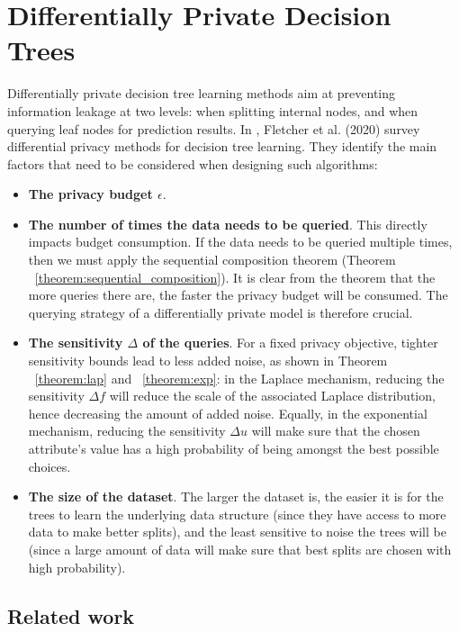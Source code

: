 \chapter{Differentially Private Decision Trees}

Differentially private decision tree learning methods aim at preventing information leakage at two levels: when splitting internal nodes, and when querying leaf nodes for prediction results. In \cite{fletcher_survey}, Fletcher et al. (2020) survey differential privacy methods for decision tree learning. They identify the main factors that need to be considered when designing such algorithms: 

\begin{itemize}
	\item \textbf{The privacy budget $\epsilon$}.
	\item \textbf{The number of times the data needs to be queried}. This directly impacts budget consumption. If the data needs to be queried multiple times, then we must apply the sequential composition theorem (Theorem ~\ref{theorem:sequential_composition}). It is clear from the theorem that the more queries there are, the faster the privacy budget will be consumed. The querying strategy of a differentially private model is therefore crucial.
	\item \textbf{The sensitivity $\Delta$ of the queries}. For a fixed privacy objective, tighter sensitivity bounds lead to less added noise, as shown in Theorem ~\ref{theorem:lap} and ~\ref{theorem:exp}: in the Laplace mechanism, reducing the sensitivity $\Delta f$ will reduce the scale of the associated Laplace distribution, hence decreasing the amount of added noise. Equally, in the exponential mechanism, reducing the sensitivity $\Delta u$ will make sure that the chosen attribute's value has a high probability of being amongst the best possible choices.
	\item \textbf{The size of the dataset}. The larger the dataset is, the easier it is for the trees to learn the underlying data structure (since they have access to more data to make better splits), and the least sensitive to noise the trees will be (since a large amount of data will make sure that best splits are chosen with high probability).
\end{itemize}

\section{Related work}

